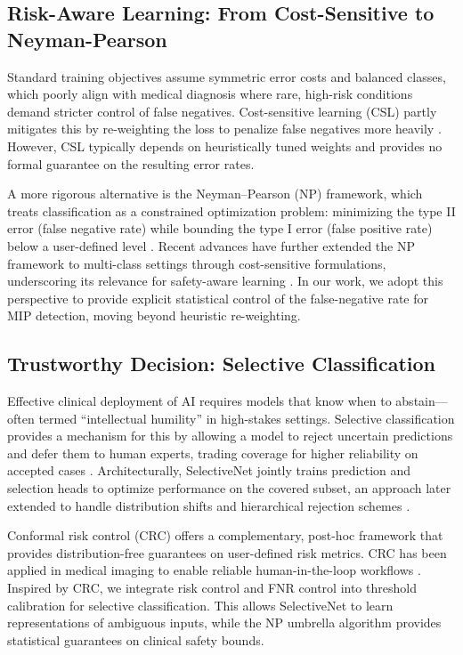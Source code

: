 \documentclass[journal,twoside,web]{ieeecolor}
\begin{document}
\subsection{Risk-Aware Learning: From Cost-Sensitive to Neyman-Pearson}

Standard training objectives assume symmetric error costs and balanced classes, which poorly align with medical diagnosis where rare, high-risk conditions demand stricter control of false negatives. Cost-sensitive learning (CSL) partly mitigates this by re-weighting the loss to penalize false negatives more heavily \cite{elkan2001foundations,he2009learning,yue2023specificity}. However, CSL typically depends on heuristically tuned weights and provides no formal guarantee on the resulting error rates.

A more rigorous alternative is the Neyman–Pearson (NP) framework, which treats classification as a constrained optimization problem: minimizing the type II error (false negative rate) while bounding the type I error (false positive rate) below a user-defined level \cite{rigollet2011neyman,tong2018neyman}. Recent advances have further extended the NP framework to multi-class settings through cost-sensitive formulations, underscoring its relevance for safety-aware learning \cite{tian2025neyman}. In our work, we adopt this perspective to provide explicit statistical control of the false-negative rate for MIP detection, moving beyond heuristic re-weighting.

\subsection{Trustworthy Decision: Selective Classification}

Effective clinical deployment of AI requires models that know when to abstain—often termed “intellectual humility” in high-stakes settings. Selective classification provides a mechanism for this by allowing a model to reject uncertain predictions and defer them to human experts, trading coverage for higher reliability on accepted cases \cite{hendrycks2016baseline, leibig2022combining, xia2024uncertainty}. Architecturally, SelectiveNet \cite{geifman2019selectivenet, geifman2017selective} jointly trains prediction and selection heads to optimize performance on the covered subset, an approach later extended to handle distribution shifts and hierarchical rejection schemes \cite{goren2024hierarchical}.


Conformal risk control (CRC) \cite{bates2021distribution, angelopoulos2022conformal} offers a complementary, post-hoc framework that provides distribution-free guarantees on user-defined risk metrics. CRC has been applied in medical imaging to enable reliable human-in-the-loop workflows \cite{dvijotham2023enhancing}. Inspired by CRC, we integrate risk control and FNR control into threshold calibration for selective classification. This allows SelectiveNet to learn representations of ambiguous inputs, while the NP umbrella algorithm provides statistical guarantees on clinical safety bounds.
\end{document}
